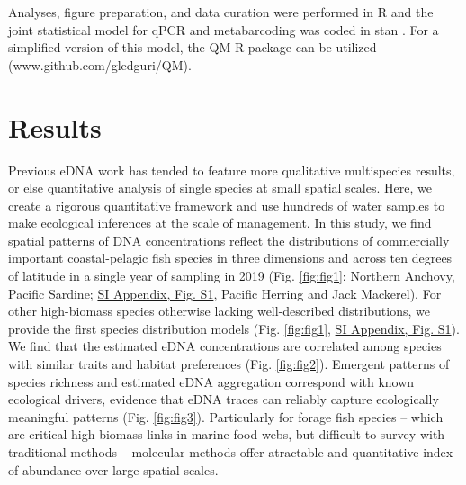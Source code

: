 \documentclass{article}
\begin{document}
Analyses, figure preparation, and data curation were performed in R \cite{rcoreteam2024} and the joint statistical model for qPCR and metabarcoding was coded in stan \cite{standevelopmentteam2023}. For a simplified version of this model, the QM R package can be utilized (www.github.com/gledguri/QM).
\section*{Results}

Previous eDNA work has tended to feature more qualitative multispecies results, or else quantitative analysis of single species at small spatial scales. Here, we create a rigorous quantitative framework and use hundreds of water samples to make ecological inferences at the scale of management. In this study, we find spatial patterns of DNA concentrations reflect the distributions of commercially important coastal-pelagic fish species in three dimensions and across ten degrees of latitude in a single year of sampling in 2019 (Fig. \ref{fig:fig1}: Northern Anchovy, Pacific Sardine; \href{SI_Appendix.pdf}{SI Appendix, Fig. S1}, Pacific Herring and Jack Mackerel). For other high-biomass species otherwise lacking well-described distributions, we provide the first species distribution models (Fig. \ref{fig:fig1}, \href{SI_Appendix.pdf}{SI Appendix, Fig. S1}). We find that the estimated eDNA concentrations are correlated among species with similar traits and habitat preferences (Fig. \ref{fig:fig2}). Emergent patterns of species richness and estimated eDNA aggregation correspond with known ecological drivers, evidence that eDNA traces can reliably capture ecologically meaningful patterns (Fig. \ref{fig:fig3}). Particularly for forage fish species -- which are critical high-biomass links in marine food webs, but difficult to survey with traditional methods \cite{Pikitch2012} -- molecular methods offer atractable and quantitative index of abundance over large spatial scales.

\end{document}

